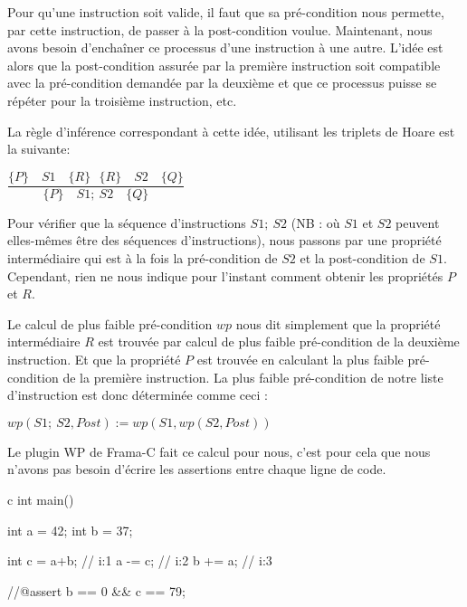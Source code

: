 \documentclass[middle]{zmdocument}
\begin{document}


Pour qu'une instruction soit valide, il faut que sa pré-condition nous 
permette, par cette instruction, de passer à la post-condition voulue. 
Maintenant, nous avons besoin d'enchaîner ce processus d'une 
instruction à une autre. L'idée est alors que la post-condition assurée par la
première instruction soit compatible avec la pré-condition demandée par la 
deuxième et que ce processus puisse se répéter pour la troisième instruction, 
etc.



La règle d'inférence correspondant à cette idée, utilisant les triplets de 
Hoare est la suivante:




\begin{center}
$\dfrac{\{P\}\quad S1 \quad \{R\} \ \ \ \{R\}\quad S2 \quad \{Q\}}{\{P\}\quad S1 ;\ S2 \quad \{Q\}}$


\end{center}


Pour vérifier que la séquence d'instructions $S1;\ S2$ (NB : où $S1$ et $S2$ 
peuvent elles-mêmes être des séquences d'instructions), nous passons par une 
propriété intermédiaire qui est à la fois la pré-condition de $S2$ et la 
post-condition de $S1$. Cependant, rien ne nous indique pour l'instant 
comment obtenir les propriétés $P$ et $R$.



Le calcul de plus faible pré-condition $wp$ nous dit simplement que la 
propriété intermédiaire $R$ est trouvée par calcul de plus faible pré-condition
de la deuxième instruction. Et que la propriété $P$ est trouvée en calculant la
plus faible pré-condition de la première instruction. La plus faible pré-condition
de notre liste d'instruction est donc déterminée comme ceci :




\begin{center}
$wp(S1;\ S2 , Post) := wp(S1, wp(S2, Post) )$


\end{center}


Le plugin WP de Frama-C fait ce calcul pour nous, c'est pour cela que nous 
n'avons pas besoin d'écrire les assertions entre chaque ligne de code.



\begin{CodeBlock}{c}
int main(){
  int a = 42;
  int b = 37;

  int c = a+b; // i:1
  a -= c;      // i:2
  b += a;      // i:3

  //@assert b == 0 && c == 79;
}
\end{CodeBlock}
\end{document}
